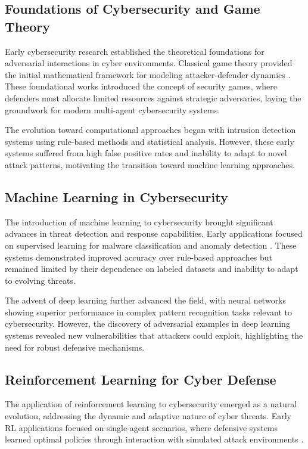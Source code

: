 \documentclass[11pt]{article}
\theoremstyle{definition}
\theoremstyle{plain}
\begin{document}
\subsection{Foundations of Cybersecurity and Game Theory}

Early cybersecurity research established the theoretical foundations for adversarial interactions in cyber environments. Classical game theory provided the initial mathematical framework for modeling attacker-defender dynamics \cite{alpcan2010network}. These foundational works introduced the concept of security games, where defenders must allocate limited resources against strategic adversaries, laying the groundwork for modern multi-agent cybersecurity systems.

The evolution toward computational approaches began with intrusion detection systems using rule-based methods and statistical analysis. However, these early systems suffered from high false positive rates and inability to adapt to novel attack patterns, motivating the transition toward machine learning approaches.

\subsection{Machine Learning in Cybersecurity}

The introduction of machine learning to cybersecurity brought significant advances in threat detection and response capabilities. Early applications focused on supervised learning for malware classification and anomaly detection \cite{sommer2010outside}. These systems demonstrated improved accuracy over rule-based approaches but remained limited by their dependence on labeled datasets and inability to adapt to evolving threats.

The advent of deep learning further advanced the field, with neural networks showing superior performance in complex pattern recognition tasks relevant to cybersecurity. However, the discovery of adversarial examples in deep learning systems \cite{goodfellow2014explaining} revealed new vulnerabilities that attackers could exploit, highlighting the need for robust defensive mechanisms.

\subsection{Reinforcement Learning for Cyber Defense}

The application of reinforcement learning to cybersecurity emerged as a natural evolution, addressing the dynamic and adaptive nature of cyber threats. Early RL applications focused on single-agent scenarios, where defensive systems learned optimal policies through interaction with simulated attack environments \cite{malialis2015distributed}.
\end{document}
